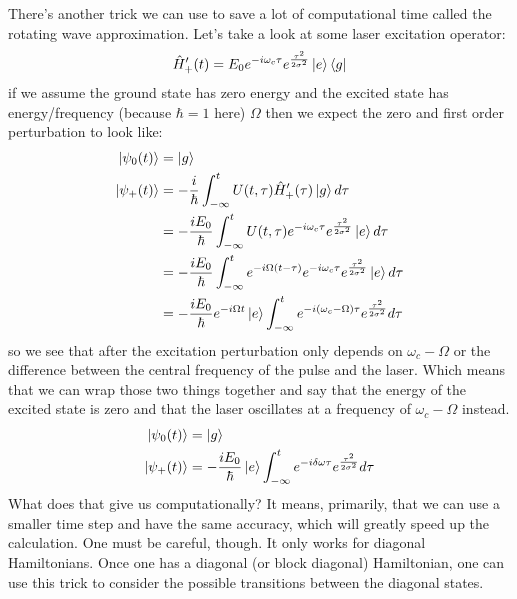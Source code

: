 There's another trick we can use to save a lot of computational time called the rotating wave approximation.  Let's take a look at some laser excitation operator:
\begin{align*}
	\hat{H}_{+}'(t) = E_0 e^{-i \omega_c \tau} e^{\frac{\tau^2 }{2 \sigma^2}}  \ket{e}\bra{g}
\end{align*}
if we assume the ground state has zero energy and the excited state has energy/frequency (because $\hbar=1$ here) $\Omega$ then we expect the zero and first order perturbation to look like:
\begin{align*}
	\ket{\psi_0 (t)} &= \ket{g} \\
	\ket{\psi_{+} (t)} &= -\frac{i}{\hbar} \int_{-\infty}^{t} U(t, \tau) \hat{H}_{+}'(\tau) \ket{g} d \tau \\
	&= -\frac{iE_0}{\hbar} \int_{-\infty}^{t} U(t, \tau)e^{-i \omega_c \tau} e^{\frac{\tau^2  }{2 \sigma^2}}  \ket{e} d \tau \\
	&= -\frac{iE_0}{\hbar} \int_{-\infty}^{t} e^{ -i\Omega (t - \tau)}e^{-i \omega_c \tau} e^{\frac{\tau^2 }{2 \sigma^2}}  \ket{e} d \tau \\
	&= -\frac{iE_0}{\hbar} e^{ -i\Omega t} \ket{e} \int_{-\infty}^{t} e^{-i ( \omega_c - \Omega) \tau} e^{\frac{\tau^2 }{2 \sigma^2}} d \tau
\end{align*}
so we see that after the excitation perturbation only depends on $\omega_c - \Omega$ or the difference between the central frequency of the pulse and the laser.  Which means that we can wrap those two things together and say that the energy of the excited state is zero and that the laser oscillates at a frequency of $\omega_c - \Omega$ instead.
\begin{align*}
	\ket{\psi_0 (t)} &= \ket{g} \\
	\ket{\psi_{+} (t)} &= -\frac{iE_0}{\hbar}\ket{e} \int_{-\infty}^{t} e^{-i \delta \omega \tau} e^{\frac{\tau^2 }{2 \sigma^2}} d \tau
\end{align*}
What does that give us computationally?  It means, primarily, that we can use a smaller time step and have the same accuracy, which will greatly speed up the calculation.  One must be careful, though.  It only works for diagonal Hamiltonians.  Once one has a diagonal (or block diagonal) Hamiltonian, one can use this trick to consider the possible transitions between the diagonal states.
